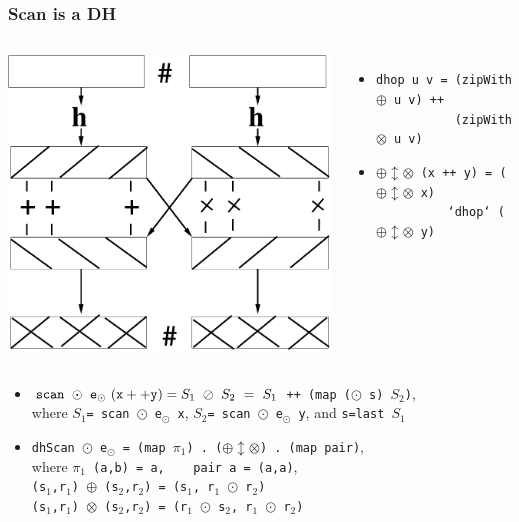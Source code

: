 \documentclass{beamer}
\begin{document}
\begin{frame}[fragile,t]
  \frametitle{Scan is a DH}

\begin{columns}
\includegraphics[height=25ex]{Figures/DH}
\vspace{-3ex}
\begin{itemize}
    \item {\tt dhop u v = (zipWith $\oplus$ u v) ++}\\ 
          {\tt~~~~~~~~~~~(zipWith $\otimes$ u v)}
    \item {\tt $\oplus\updownarrow\otimes$ (x ++ y) = ($\oplus\updownarrow\otimes$ x)}\\
          {\tt~~~~~~~~~~`dhop` ($\oplus\updownarrow\otimes$ y)} 
\end{itemize}
\end{columns}


\begin{itemize}
    \item ${\tt scan} \ \odot \ {\tt e}_{\odot} \ {\tt(x++y)} = S_1~\oslash~S_2~=~S_1$
            {\tt ++ (map ($\odot$ s) $S_2$)},\\ 
            where $S_1${\tt = scan $\odot$ e$_{\odot}$ x},
                  $S_2${\tt = scan $\odot$ e$_{\odot}$ y}, and {\tt s=last $S_1$}\medskip
 
    \item {\tt dhScan $\odot$ e$_{\odot}$ = (map $\pi_1$) . ($\oplus\updownarrow\otimes$) . (map pair)},\\
            where {\tt $\pi_1$ (a,b) = a,~~~~pair a = (a,a)},\\
            {\tt (s$_1$,r$_1$) $\oplus$ (s$_2$,r$_2$) = (s$_1$, r$_1$ $\odot$ r$_2$)}\\
            {\tt (s$_1$,r$_1$) $\otimes$ (s$_2$,r$_2$) = (r$_1$ $\odot$ s$_2$, r$_1$ $\odot$ r$_2$)}
\end{itemize}

\end{frame}
\end{document}

